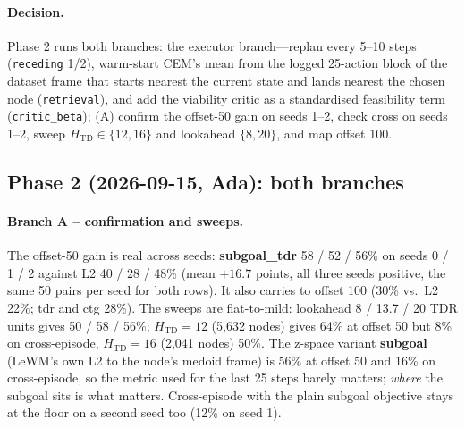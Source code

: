 \documentclass[11pt]{article}
\newcommand{\Htd}{H_{\mathrm{TD}}}
\begin{document}
\paragraph{Decision.} Phase 2 runs both branches: the executor branch---replan every 5--10
steps (\texttt{receding} 1/2), warm-start CEM's mean from the logged 25-action block of the
dataset frame that starts nearest the current state and lands nearest the chosen node
(\texttt{retrieval}), and add the viability critic as a standardised feasibility term
(\texttt{critic\_beta}); (A) confirm the offset-50 gain on seeds 1--2, check cross on seeds
1--2, sweep $\Htd\in\{12,16\}$ and lookahead $\{8,20\}$, and map offset 100.

\subsection{Phase 2 (2026-09-15, Ada): both branches}
\paragraph{Branch A -- confirmation and sweeps.} The offset-50 gain is real across seeds:
\textbf{subgoal\_tdr} 58 / 52 / 56\% on seeds 0 / 1 / 2 against L2 40 / 28 / 48\% (mean
$+16.7$ points, all three seeds positive, the same 50 pairs per seed for both rows). It also
carries to offset 100 (30\% vs.\ L2 22\%; tdr and ctg 28\%). The sweeps are flat-to-mild:
lookahead 8 / 13.7 / 20 TDR units gives 50 / 58 / 56\%; $\Htd=12$ (5,632 nodes) gives 64\% at
offset 50 but 8\% on cross-episode, $\Htd=16$ (2,041 nodes) 50\%. The z-space variant
\textbf{subgoal} (LeWM's own L2 to the node's medoid frame) is 56\% at offset 50 and 16\% on
cross-episode, so the metric used for the last 25 steps barely matters; \emph{where} the
subgoal sits is what matters. Cross-episode with the plain subgoal objective stays at the
floor on a second seed too (12\% on seed 1).
\end{document}
